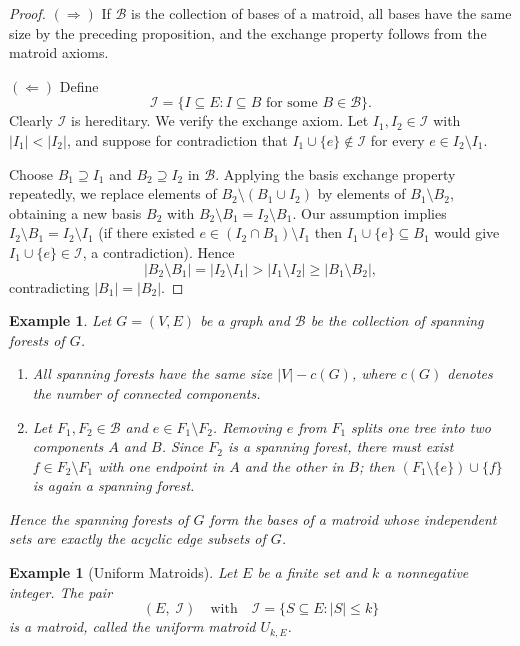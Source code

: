 \documentclass[11pt]{article}
\theoremstyle{plain}
\newtheorem{example}[theorem]{Example}
\theoremstyle{definition}
\begin{document}
\begin{proof}
$(\Rightarrow)$ If $\mathcal{B}$ is the collection of bases of a matroid,
all bases have the same size by the preceding proposition, and the exchange
property follows from the matroid axioms.
 
$(\Leftarrow)$ Define
\[
  \mathcal{I} = \{I \subseteq E : I \subseteq B \text{ for some } B \in \mathcal{B}\}.
\]
Clearly $\mathcal{I}$ is hereditary.
We verify the exchange axiom.
Let $I_1, I_2 \in \mathcal{I}$ with $|I_1| < |I_2|$, and suppose for
contradiction that $I_1 \cup \{e\} \notin \mathcal{I}$ for every
$e \in I_2 \setminus I_1$.
 
Choose $B_1 \supseteq I_1$ and $B_2 \supseteq I_2$ in $\mathcal{B}$.
Applying the basis exchange property repeatedly, we replace elements of
$B_2 \setminus (B_1 \cup I_2)$ by elements of $B_1 \setminus B_2$,
obtaining a new basis $B_2$ with $B_2 \setminus B_1 = I_2 \setminus B_1$.
Our assumption implies $I_2 \setminus B_1 = I_2 \setminus I_1$
(if there existed $e \in (I_2 \cap B_1) \setminus I_1$ then
$I_1 \cup \{e\} \subseteq B_1$ would give $I_1 \cup \{e\} \in \mathcal{I}$,
a contradiction).
Hence
\[
  |B_2 \setminus B_1| = |I_2 \setminus I_1| > |I_1 \setminus I_2|
  \ge |B_1 \setminus B_2|,
\]
contradicting $|B_1| = |B_2|$.
\end{proof}
 
\begin{example}
Let $G = (V,E)$ be a graph and $\mathcal{B}$ be the collection of spanning
forests of $G$.
\begin{enumerate}[label=(\roman*), itemsep=0.4ex]
  \item All spanning forests have the same size $|V| - c(G)$, where $c(G)$
        denotes the number of connected components.
  \item Let $F_1, F_2 \in \mathcal{B}$ and $e \in F_1 \setminus F_2$.
        Removing $e$ from $F_1$ splits one tree into two components $A$ and $B$.
        Since $F_2$ is a spanning forest, there must exist
        $f \in F_2 \setminus F_1$ with one endpoint in $A$ and the other in $B$;
        then $(F_1 \setminus \{e\}) \cup \{f\}$ is again a spanning forest.
\end{enumerate}
Hence the spanning forests of $G$ form the bases of a matroid whose
independent sets are exactly the acyclic edge subsets of $G$.
\end{example}
 
\begin{example}[Uniform Matroids]
Let $E$ be a finite set and $k$ a nonnegative integer. The pair
\[
  (E,\; \mathcal{I}) \quad\text{with}\quad
  \mathcal{I} = \{S \subseteq E : |S| \le k\}
\]
is a matroid, called the \emph{uniform matroid} $U_{k,E}$.
\end{example}
 
\end{document}
